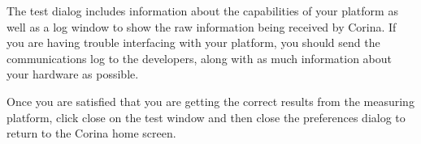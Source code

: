 The test dialog includes information about the capabilities of your platform as well as a log window to show the raw information being received by Corina.  If you are having trouble interfacing with your platform, you should send the communications log to the developers, along with as much information about your hardware as possible.

Once you are satisfied that you are getting the correct results from the measuring platform, click close on the test window and then close the preferences dialog to return to the Corina home screen.





